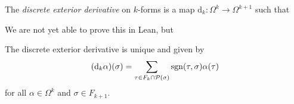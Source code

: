 \begin{definition}\label{def:discrete_exterior_derivative}
    The \emph{discrete exterior derivative} on $k$-forms is a map $\mathrm{d}_k \colon \Omega^k \to \Omega^{k+1}$ such that 
\end{definition}

We are not yet able to prove this in Lean, but 

\begin{theorem}\label{thm:discrete_exterior_derivative_unique}
    The discrete exterior derivative is unique and given by 
    \[ (\mathrm{d}_k \alpha)(\sigma) = \sum_{\tau \in F_k \cap \mathcal{P}(\sigma)} \mathrm{sgn}(\tau,\sigma) \alpha(\tau) \] %
    for all $\alpha \in \Omega^k$ and $\sigma \in F_{k+1}$.
\end{theorem}
